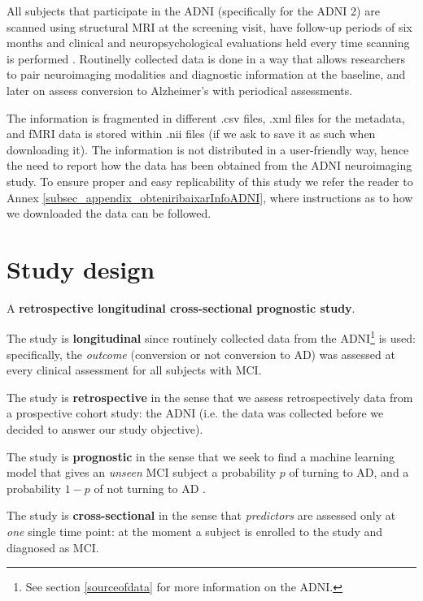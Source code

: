 \documentclass[a4paper,12pt]{elsarticle}  %
\begin{document}
All subjects that participate in the ADNI (specifically for the ADNI 2) are scanned using structural MRI at the screening visit, have follow-up periods of six months and clinical and neuropsychological evaluations held every time scanning is performed \cite{adni1_protocol_extension}. Routinelly collected data is done in a way that allows researchers to pair neuroimaging modalities and diagnostic information at the baseline, and later on assess conversion to Alzheimer's with periodical assessments.

The information is fragmented in different .csv files, .xml files for the metadata, and fMRI data is stored within .nii files (if we ask to save it as such when downloading it). The information is not distributed in a user-friendly way, hence the need to report how the data has been obtained from the ADNI neuroimaging study. To ensure proper and easy replicability of this study we refer the reader to Annex \ref{subsec_appendix_obteniribaixarInfoADNI}, where instructions as to how we downloaded the data can be followed.



\section{Study design}  \label{study design} %

	A \textbf{retrospective longitudinal cross-sectional prognostic study}.
	
	The study is \textbf{longitudinal} since routinely collected data from the ADNI\footnote{See section \ref{sourceofdata} for more information on the ADNI.} is used: specifically, the \textit{outcome} (conversion or not conversion to AD) was assessed at every clinical assessment for all subjects with MCI. 
	
	The study is \textbf{retrospective} in the sense that we assess retrospectively data from a prospective cohort study: the ADNI (i.e. the data was collected before we decided to answer our study objective).
	
	The study is \textbf{prognostic} in the sense that we seek to find a machine learning model that gives an \textit{unseen} MCI subject a probability $p$ of turning to AD, and a probability $1-p$ of not turning to AD .
	
	The study is \textbf{cross-sectional} in the sense that \textit{predictors} are assessed only at \textit{one} single time point: at the moment a subject is enrolled to the study and diagnosed as MCI.
	
\end{document}
